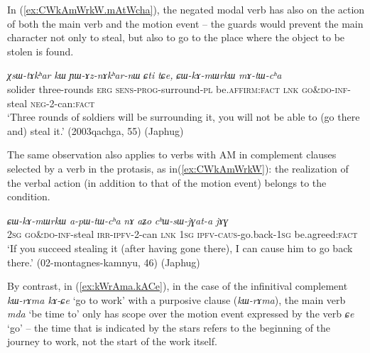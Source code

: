 \documentclass[oneside,a4paper,11pt]{article}
\newcommand{\ipa}[1]{{\phon\textit{#1}}}
\newcommand{\forme}[1]{\textit{\phon#1}}
\newcommand{\japhug}[2]{\textit{\phon#1} `#2'}
\newcommand{\rouge}[1]{{\color{red}#1}}
\begin{document}
 In (\ref{ex:CWkAmWrkW.mAtWcha}), the negated modal verb has also on the action of both the main verb and the motion event -- the guards would prevent the main character not only to steal, but also to go to the place where the object to be stolen is found.
 
\begin{exe}
\ex \label{ex:CWkAmWrkW.mAtWcha}
\gll \ipa{ʁmaʁ}	\ipa{χsɯ-tɤkʰar}	\ipa{kɯ}	\ipa{ɲɯ-ɤz-nɤkʰar-nɯ}	\ipa{ɕti}	\ipa{tɕe,}	\ipa{\rouge{ɕɯ}-kɤ-mɯrkɯ}	\ipa{mɤ-tɯ-cʰa}  \\
solider three-rounds \textsc{erg} \textsc{sens}-\textsc{prog}-surround-\textsc{pl} be.\textsc{affirm}:\textsc{fact} \textsc{lnk}  \rouge{\textsc{go\&do}}-\textsc{inf}-steal \textsc{neg}-2-can:\textsc{fact} \\
\glt `Three rounds of soldiers will be surrounding it, you will not be able to (go there and) steal it.' (2003qachga, 55) (Japhug)
   \end{exe}
 
The same observation also applies to  verbs with AM in complement clauses selected by a verb in the protasis, as in(\ref{ex:CWkAmWrkW}): the realization of the verbal action (in addition to that of the motion event) belongs to the condition.

\begin{exe}
\ex \label{ex:CWkAmWrkW}
\gll \ipa{nɤʑo}	\ipa{\rouge{ɕɯ}-kɤ-mɯrkɯ}	\ipa{a-pɯ-tɯ-cʰa}	\ipa{nɤ}	\ipa{aʑo}	\ipa{cʰɯ-sɯ-jɣat-a}	\ipa{jɤɣ} \\
\textsc{2sg} \rouge{\textsc{go\&do}}-\textsc{inf}-steal \textsc{irr}-\textsc{ipfv}-2-can \textsc{lnk} \textsc{1sg} \textsc{ipfv}-\textsc{caus}-go.back-\textsc{1sg} be.agreed:\textsc{fact} \\
\glt `If you succeed stealing it (after having gone there), I can cause him to go back there.' (02-montagnes-kamnyu, 46) (Japhug)
\end{exe}

By contrast, in  (\ref{ex:kWrAma.kACe}), in the case of the infinitival complement \forme{kɯ-rɤma kɤ-ɕe} `go to work' with a purposive clause (\forme{kɯ-rɤma}), the main verb \japhug{mda}{be time to} only has scope over the motion event expressed by the verb \japhug{ɕe}{go} -- the time that is indicated by the stars refers to the beginning of the journey to work, not the start of the work itself.
 
\end{document}
